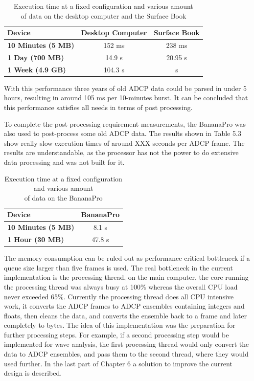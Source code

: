 \begin{table}[!h]
\centering
	\begin{tabular}{|l|c|c|}
	  \hline
	  	\textbf{Device} & \textbf{Desktop Computer} & \textbf{Surface Book}\\ \hline
	  	\textbf{10 Minutes (5 MB)} & 152 ms & 238 ms\\
	  	\textbf{1 Day (700 MB)} & 14.9 s & 20.95 s\\
	  	\textbf{1 Week (4.9 GB)} & 104.3 s & s\\
	  \hline
	\end{tabular}
	\centering
	\caption{Execution time at a fixed configuration and various amount\\ of data on the desktop computer and the Surface Book}
\end{table}

With this performance three years of old ADCP data could be parsed in under 5 hours, resulting in around 105 ms per 10-minutes burst. It can be concluded that this performance satisfies all needs in terms of post processing.

To complete the post processing requirement measurements, the BananaPro was also used to post-process some old ADCP data. The results shown in Table 5.3 show really slow execution times of around XXX seconds per ADCP frame. The results are understandable, as the processor has not the power to do extensive data processing and was not built for it.

\begin{table}[!h]
\centering
	\begin{tabular}{|l|c|}
	  \hline
	  	\textbf{Device} & \textbf{BananaPro}\\ \hline
	  	\textbf{10 Minutes (5 MB)} & 8.1 s \\
	  	\textbf{1 Hour (30 MB)} & 47.8 s \\
	  \hline
	\end{tabular}
	\begin{center}
			\caption{Execution time at a fixed configuration and various amount\\ of data on the BananaPro}
	\end{center}
\end{table}

The memory consumption can be ruled out as performance critical bottleneck if a queue size larger than five frames is used. The real bottleneck in the current implementation is the processing thread, on the main computer, the core running the processing thread was always busy at 100\% whereas the overall CPU load never exceeded 65\%. Currently the processing thread does all CPU intensive work, it converts the ADCP frames to ADCP ensembles containing integers and floats, then cleans the data, and converts the ensemble back to a frame and later completely to bytes. The idea of this implementation was the preparation for further processing steps. For example, if a second processing step would be implemented for wave analysis, the first processing thread would only convert the data to ADCP ensembles, and pass them to the second thread, where they would used further. In the last part of Chapter 6 a solution to improve the current design is described.

